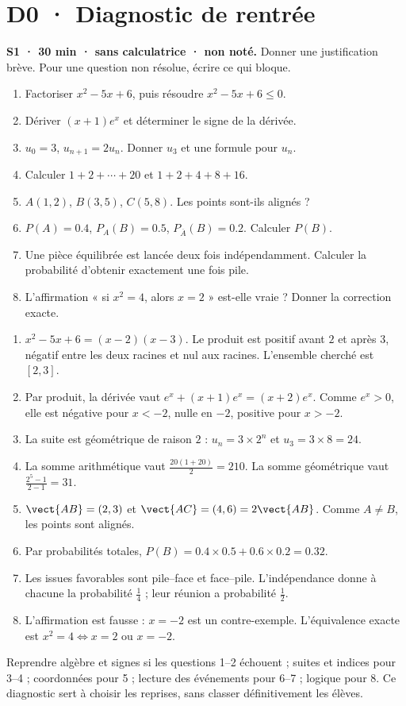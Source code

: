 \mxnewpage\chapter*{D0 · Diagnostic de rentrée}
\textbf{S1 · 30 min · sans calculatrice · non noté.} Donner une justification brève. Pour une question non résolue, écrire ce qui bloque.
\begin{enumerate}
\item Factoriser $x^2-5x+6$, puis résoudre $x^2-5x+6\le0$.
\item Dériver $(x+1)e^x$ et déterminer le signe de la dérivée.
\item $u_0=3$, $u_{n+1}=2u_n$. Donner $u_3$ et une formule pour $u_n$.
\item Calculer $1+2+\cdots+20$ et $1+2+4+8+16$.
\item $A(1,2)$, $B(3,5)$, $C(5,8)$. Les points sont-ils alignés ?
\item $P(A)=\num{0,4}$, $P_A(B)=\num{0,5}$, $P_{\overline A}(B)=\num{0,2}$. Calculer $P(B)$.
\item Une pièce équilibrée est lancée deux fois indépendamment. Calculer la probabilité d'obtenir exactement une fois pile.
\item L'affirmation « si $x^2=4$, alors $x=2$ » est-elle vraie ? Donner la correction exacte.
\end{enumerate}
\ifmxteacher\begin{teachernote}
\begin{enumerate}
\item $x^2-5x+6=(x-2)(x-3)$. Le produit est positif avant $2$ et après $3$, négatif entre les deux racines et nul aux racines. L'ensemble cherché est $[2,3]$.
\item Par produit, la dérivée vaut $e^x+(x+1)e^x=(x+2)e^x$. Comme $e^x>0$, elle est négative pour $x<-2$, nulle en $-2$, positive pour $x>-2$.
\item La suite est géométrique de raison $2$ : $u_n=3\times2^n$ et $u_3=3\times8=24$.
\item La somme arithmétique vaut $\frac{20(1+20)}{2}=210$. La somme géométrique vaut $\frac{2^5-1}{2-1}=31$.
\item $\vect{AB}=(2,3)$ et $\vect{AC}=(4,6)=2\vect{AB}$. Comme $A\ne B$, les points sont alignés.
\item Par probabilités totales, $P(B)=\num{0,4}\times\num{0,5}+\num{0,6}\times\num{0,2}=\num{0,32}$.
\item Les issues favorables sont pile--face et face--pile. L'indépendance donne à chacune la probabilité $\frac{1}{4}$ ; leur réunion a probabilité $\frac{1}{2}$.
\item L'affirmation est fausse : $x=-2$ est un contre-exemple. L'équivalence exacte est $x^2=4\Longleftrightarrow x=2\text{ ou }x=-2$.
\end{enumerate}
Reprendre algèbre et signes si les questions 1--2 échouent ; suites et indices pour 3--4 ; coordonnées pour 5 ; lecture des événements pour 6--7 ; logique pour 8. Ce diagnostic sert à choisir les reprises, sans classer définitivement les élèves.
\end{teachernote}\fi
\mainmatter


